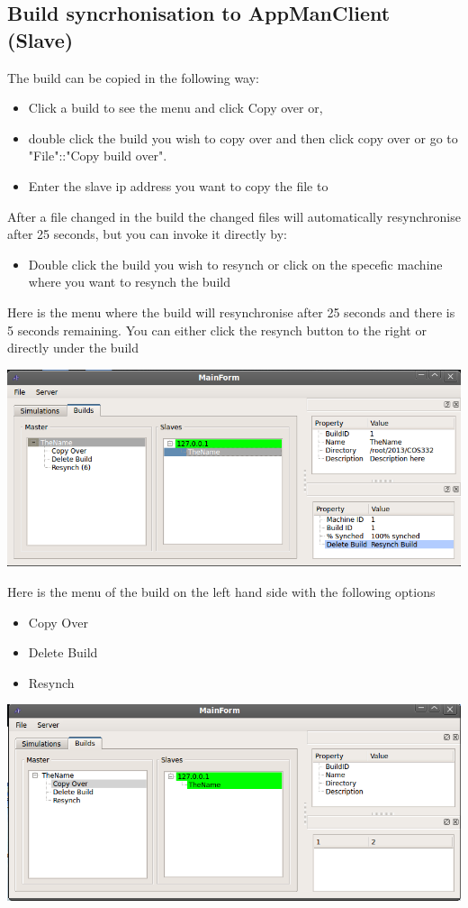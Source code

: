 \documentclass[a4paper,12pt,final]{article}
\begin{document}
\subsection{Build syncrhonisation to AppManClient (Slave)}
The build can be copied in the following way:
\begin{itemize}
\item Click a build to see the menu and click Copy over or,
\item double click the build you wish to copy over and then click copy over or go to "File"::"Copy build over".
\item Enter the slave ip address you want to copy the file to
\end{itemize}

After a file changed in the build the changed files will automatically resynchronise after 25 seconds, but you can invoke it directly by:
\begin{itemize}
\item Double click the build you wish to resynch or click on the specefic machine where you want to resynch the build
\end{itemize}
 
 
Here is the menu where the build will resynchronise after 25 seconds and there is 5 seconds remaining. You can either click the resynch button to the right or directly under the build
\begin{center}
  	\includegraphics[scale=0.4]{5secResynch.png}
 \end{center}
 
 
Here is the menu of the build on the left hand side with the following options
\begin{itemize}
\item Copy Over

\item Delete Build
\item Resynch
\end{itemize}
\begin{center}
  	\includegraphics[scale=0.4]{MENU.png}
 \end{center}
 
\end{document}
